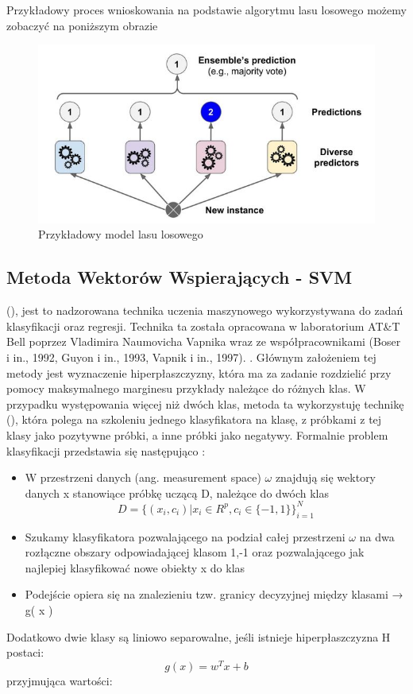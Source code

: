 Przykładowy proces wnioskowania na podstawie algorytmu lasu losowego możemy zobaczyć na poniższym obrazie
\begin{figure}[h] 
        \centering\includegraphics[width=14cm]{figures/randomForestModel.JPG}
        \caption{Przykładowy model lasu losowego \cite{Geron}}
\end{figure}

\newpage

\subsection{Metoda Wektorów Wspierających - SVM}
 (), jest to nadzorowana technika uczenia maszynowego wykorzystywana do zadań klasyfikacji oraz regresji. Technika ta została opracowana w laboratorium AT\&T Bell poprzez Vladimira Naumovicha Vapnika wraz ze współpracownikami (Boser i in., 1992, Guyon i in., 1993, Vapnik i in., 1997). \cite{Wiki:SVM}. Głównym założeniem tej metody jest wyznaczenie hiperpłaszczyzny, która ma za zadanie rozdzielić przy pomocy maksymalnego marginesu przykłady należące do różnych klas. W przypadku występowania więcej niż dwóch klas, metoda ta wykorzystuję technikę  (), która polega na szkoleniu jednego klasyfikatora na klasę, z próbkami z tej klasy jako pozytywne próbki, a inne próbki jako negatywy. Formalnie problem klasyfikacji przedstawia się następująco \cite{Prezentacja:SVM2}: 
\begin{itemize}
    \item W przestrzeni danych (ang. measurement space) $\omega$ znajdują się wektory danych x stanowiące próbkę uczącą D, należące do dwóch klas\\
    \begin{equation}
D = \big\{(x_{i}, c_{i}) | x_{i} \in R^{p}, c_{i} \in \{-1, 1\}\big\}_{i=1}^{N}
    \end{equation}
    \item Szukamy klasyfikatora pozwalającego na podział całej przestrzeni $\omega$ na dwa rozłączne obszary odpowiadającej klasom {1,-1} oraz pozwalającego jak najlepiej klasyfikować nowe obiekty x do klas
    \item Podejście opiera się na znalezieniu tzw. granicy decyzyjnej między klasami → g( x )
\end{itemize}
Dodatkowo dwie klasy są liniowo separowalne, jeśli istnieje hiperpłaszczyzna H postaci: \[g(x) = w^Tx + b\] przyjmująca wartości: 

